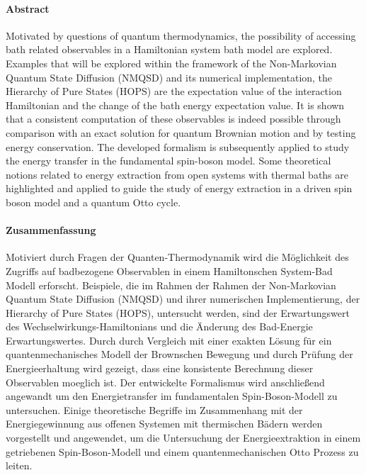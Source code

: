 \paragraph{Abstract}

Motivated by questions of quantum thermodynamics, the possibility of
accessing bath related observables in a Hamiltonian system bath
model are explored.  Examples that will be explored within the
framework of the Non-Markovian Quantum State Diffusion (NMQSD) and its
numerical implementation, the Hierarchy of Pure States (HOPS) are the
expectation value of the interaction Hamiltonian and the change of the
bath energy expectation value.  It is shown that a consistent
computation of these observables is indeed possible through comparison
with an exact solution for quantum Brownian motion and by testing
energy conservation.  The developed formalism is subsequently applied
to study the energy transfer in the fundamental spin-boson model. Some
theoretical notions related to energy extraction from open systems
with thermal baths are highlighted and applied to guide the study of
energy extraction in a driven spin boson model and a quantum Otto
cycle.


\paragraph{Zusammenfassung}

Motiviert durch Fragen der Quanten-Thermodynamik wird die Möglichkeit
des Zugriffs auf badbezogene Observablen in einem Hamiltonschen
System-Bad Modell erforscht.  Beispiele, die im Rahmen der Rahmen der
Non-Markovian Quantum State Diffusion (NMQSD) und ihrer numerischen
Implementierung, der Hierarchy of Pure States (HOPS), untersucht
werden, sind der Erwartungswert des Wechselwirkungs-Hamiltonians und
die Änderung des Bad-Energie Erwartungswertes.  Durch durch Vergleich
mit einer exakten Lösung für ein quantenmechanisches Modell der
Brownschen Bewegung und durch Prüfung der Energieerhaltung wird
gezeigt, dass eine konsistente Berechnung dieser Observablen moeglich
ist.  Der entwickelte Formalismus wird anschließend angewandt um den
Energietransfer im fundamentalen Spin-Boson-Modell zu
untersuchen. Einige theoretische Begriffe im Zusammenhang mit der
Energiegewinnung aus offenen Systemen mit thermischen Bädern werden
vorgestellt und angewendet, um die Untersuchung der Energieextraktion
in einem getriebenen Spin-Boson-Modell und einem quantenmechanischen
Otto Prozess zu leiten.
